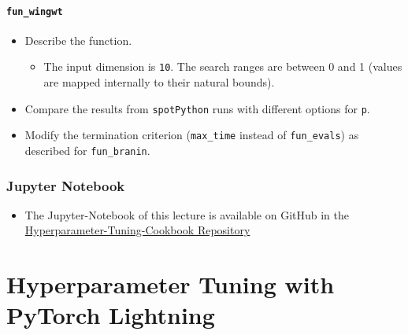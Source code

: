 \documentclass[
  letterpaper,
  DIV=11,
  numbers=noendperiod]{scrreprt}
\providecommand{\tightlist}{%
  \setlength{\itemsep}{0pt}\setlength{\parskip}{0pt}}\usepackage{longtable,booktabs,array}
\begin{document}
\subsection{\texorpdfstring{\texttt{fun\_wingwt}}{fun\_wingwt}}\label{fun_wingwt-1}

\begin{itemize}
\tightlist
\item
  Describe the function.

  \begin{itemize}
  \tightlist
  \item
    The input dimension is \texttt{10}. The search ranges are between 0
    and 1 (values are mapped internally to their natural bounds).
  \end{itemize}
\item
  Compare the results from \texttt{spotPython} runs with different
  options for \texttt{p}.
\item
  Modify the termination criterion (\texttt{max\_time} instead of
  \texttt{fun\_evals}) as described for \texttt{fun\_branin}.
\end{itemize}

\section{Jupyter Notebook}\label{jupyter-notebook-9}

\begin{tcolorbox}[enhanced jigsaw, left=2mm, opacitybacktitle=0.6, leftrule=.75mm, toptitle=1mm, opacityback=0, colback=white, rightrule=.15mm, colframe=quarto-callout-note-color-frame, title=\textcolor{quarto-callout-note-color}{\faInfo}\hspace{0.5em}{Note}, toprule=.15mm, coltitle=black, bottomrule=.15mm, bottomtitle=1mm, colbacktitle=quarto-callout-note-color!10!white, titlerule=0mm, breakable, arc=.35mm]

\begin{itemize}
\tightlist
\item
  The Jupyter-Notebook of this lecture is available on GitHub in the
  \href{https://github.com/sequential-parameter-optimization/Hyperparameter-Tuning-Cookbook/blob/main/015_num_spot_correlation_p.ipynb}{Hyperparameter-Tuning-Cookbook
  Repository}
\end{itemize}

\end{tcolorbox}

\part{Hyperparameter Tuning with PyTorch Lightning}
\end{document}
